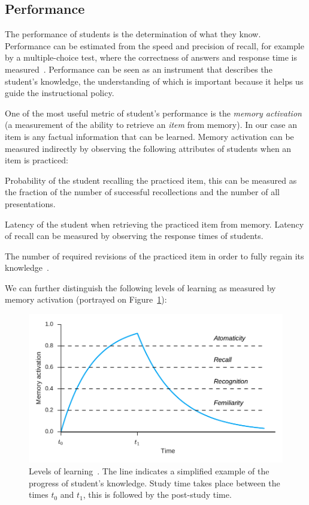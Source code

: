 \subsection{Performance}

The performance of students is the determination of what they know. Performance can be estimated from the speed and precision of recall, for example by a multiple-choice test, where the correctness of answers and response time is measured~\cite{Lewis}. Performance can be seen as an instrument that describes the student's knowledge, the understanding of which is important because it helps us guide the instructional policy.

One of the most useful metric of student's performance is the \textit{memory activation} (a measurement of the ability to retrieve an \textit{item} from memory). In our case an item is any factual information that can be learned. Memory activation can be measured indirectly by observing the following attributes of students when an item is practiced:

\begin{description}[leftmargin=0cm]
  \item[Probability of recall] Probability of the student recalling the practiced item, this can be measured as the fraction of the number of successful recollections and the number of all presentations.
  \item[Latency of recall] Latency of the student when retrieving the practiced item from memory. Latency of recall can be measured by observing the response times of students.
  \item[Savings in relearning] The number of required revisions of the practiced item in order to fully regain its knowledge~\cite{MichaelW.Eysenck2008}.
\end{description}

We can further distinguish the following levels of learning as measured by memory activation (portrayed on Figure~\ref{fig:knowledge-levels}):

\begin{figure}[htbp]
  \centering
  \includegraphics[width=\textwidth]{img/knowledge-levels}
  \caption{Levels of learning~\cite{Lewis}. The line indicates a simplified example of the progress of student's knowledge. Study time takes place between the times $t_0$ and $t_1$, this is followed by the post-study time.}
  \label{fig:knowledge-levels}
\end{figure}


